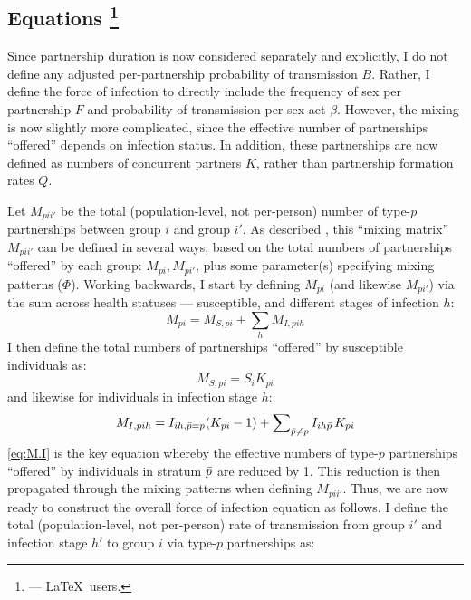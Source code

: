 \subsection[Equations]{Equations%
  \footnote{ --- \LaTeX\ users.}}\label{foi.prop.eq}
Since partnership duration is now considered separately and explicitly,
I do not define any adjusted per-partnership probability of transmission $B$.
Rather, I define the force of infection to directly include
the frequency of sex per partnership $F$ and probability of transmission per sex act $\beta$.
However, the mixing is now slightly more complicated,
since the effective number of partnerships ``offered'' depends on infection status.
In addition, these partnerships are now defined as numbers of concurrent partners $K$,
rather than partnership formation rates $Q$.
\par
Let $M_{pii'}$ be the total (population-level, not per-person)
number of type-$p$ partnerships between group $i$ and group $i'$.
As described , this ``mixing matrix'' $M_{pii'}$ can be defined in several ways,
based on the total numbers of partnerships ``offered'' by each group: $M_{pi}, M_{pi'}$,
plus some parameter(s) specifying mixing patterns (\eg $\Phi$).
Working backwards, I start by defining $M_{pi}$ (and likewise $M_{pi'}$) via
the sum across health statuses --- \ie susceptible, and different stages of infection $h$:
\begin{equation}\label{eq:M.SI}
  M_{pi} = M_{S,pi} + \sum_h M_{I,pih}
\end{equation}
I then define the total numbers of partnerships ``offered'' by susceptible individuals as:
\begin{equation}
  M_{S,pi} = S_{i} K_{pi} \label{eq:M.S}
\end{equation}
and likewise for individuals in infection stage $h$:
\begin{equation}
  M_{I,pih} = I_{ih,\bar{p}=p} (K_{pi}-1) + \sum\nolimits_{\bar{p} \ne p} I_{ih\bar{p}}\,K_{pi} \label{eq:M.I}
\end{equation}
\eqref{eq:M.I} is the key equation whereby
the effective numbers of type-$p$ partnerships ``offered'' by
individuals in stratum $\bar{p}$ are reduced by 1.
This reduction is then propagated through the mixing patterns when defining $M_{pii'}$.
Thus, we are now ready to construct the overall force of infection equation as follows.
I define the total (population-level, not per-person) rate of transmission
from group $i'$ and infection stage $h'$ to group $i$ via type-$p$ partnerships as:
